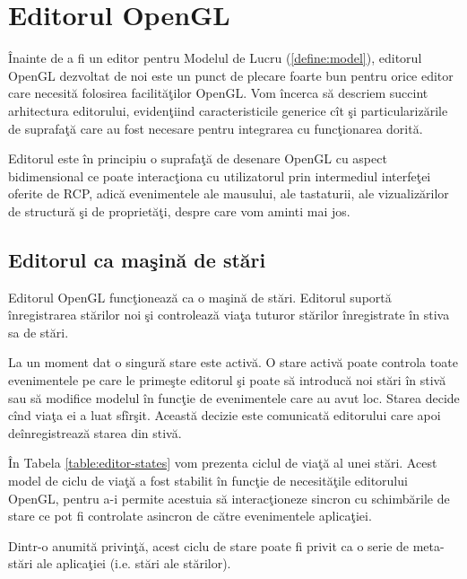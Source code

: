\section{Editorul OpenGL}
\label{section:opengl-editor}

Înainte de a fi un editor pentru Modelul de Lucru (\ref{define:model}), 
editorul OpenGL dezvoltat de noi este un punct de plecare foarte bun pentru 
orice editor care necesită folosirea facilităţilor OpenGL. Vom încerca să 
descriem succint arhitectura editorului, evidenţiind caracteristicile generice 
cît şi particularizările de suprafaţă care au fost necesare pentru integrarea 
cu funcţionarea dorită.

Editorul este în principiu o suprafaţă de desenare OpenGL cu aspect 
bidimensional ce poate interacţiona cu utilizatorul prin intermediul interfeţei 
oferite de RCP, adică evenimentele ale mausului, ale tastaturii, ale 
vizualizărilor de structură şi de proprietăţi, despre care vom aminti mai jos.


\subsection{Editorul ca maşină de stări}
\label{section:machine}

Editorul OpenGL funcţionează ca o maşină de stări. Editorul suportă 
înregistrarea stărilor noi şi controlează viaţa tuturor stărilor înregistrate 
în stiva sa de stări.

La un moment dat o singură stare este activă. O stare activă poate controla 
toate evenimentele pe care le primeşte editorul şi poate să introducă noi stări 
în stivă sau să modifice modelul în funcţie de evenimentele care au avut loc. 
Starea decide cînd viaţa ei a luat sfîrşit. Această decizie este comunicată 
editorului care apoi deînregistrează starea din stivă.

În Tabela \ref{table:editor-states} vom prezenta ciclul de viaţă al unei stări. 
Acest model de ciclu de viaţă a fost stabilit în funcţie de necesităţile 
editorului OpenGL, pentru a-i permite acestuia să interacţioneze sincron cu 
schimbările de stare ce pot fi controlate asincron de către evenimentele 
aplicaţiei.

Dintr-o anumită privinţă, acest ciclu de stare poate fi privit ca o serie de 
meta-stări ale aplicaţiei (i.e. stări ale stărilor).

